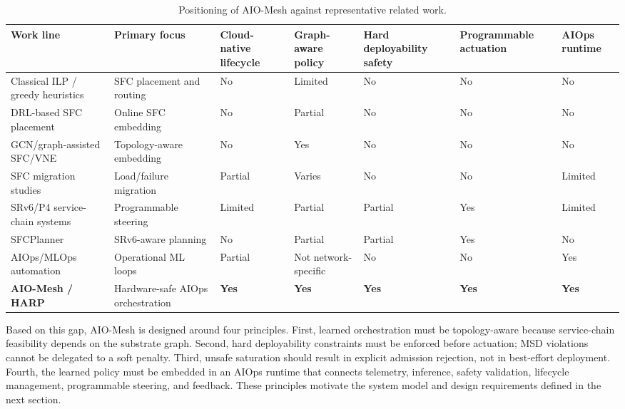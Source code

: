 \documentclass[final,5p]{elsarticle}
\begin{document}
\begin{table}[t]
\centering
\caption{Positioning of AIO-Mesh against representative related work.}
\label{tab:related_comparison}
\renewcommand{\arraystretch}{1.15}
\small
\begin{tabular}{p{4.0cm}p{3.1cm}p{2.0cm}p{2.1cm}p{2.0cm}p{2.0cm}p{1.8cm}}
\toprule
\textbf{Work line} & \textbf{Primary focus} & \textbf{Cloud-native lifecycle} & \textbf{Graph-aware policy} & \textbf{Hard deployability safety} & \textbf{Programmable actuation} & \textbf{AIOps runtime} \\
\midrule
Classical ILP / greedy heuristics & SFC placement and routing & No & Limited & No & No & No \\
DRL-based SFC placement~\cite{wang2021drl,taktak2024drl,li2023qosaware} & Online SFC embedding & No & Partial & No & No & No \\
GCN/graph-assisted SFC/VNE~\cite{xiao2023twostage,pei2025graph,liu2024sfcml} & Topology-aware embedding & No & Yes & No & No & No \\
SFC migration studies~\cite{zhai2023migration,addad2022ai,qin2023sfcmigrationbudget,afrasiabi2024cluster,zhang2025sfcmigration,hu2026rlpmo} & Load/failure migration & Partial & Varies & No & No & Limited \\
SRv6/P4 service-chain systems~\cite{stockmayer2020p4sfc,xiang2019p4sc,yan2024srv6int,li2024stsfc,ma2024sfcache} & Programmable steering & Limited & Partial & Partial & Yes & Limited \\
SFCPlanner~\cite{qiu2024sfcplanner} & SRv6-aware planning & No & Partial & Partial & Yes & No \\
AIOps/MLOps automation~\cite{kreuzberger2023mlops,diazdearcaya2024joint,eken2025mlops,bayram2025trustworthy,zhang2025aiopsllm,eramo2024architecture} & Operational ML loops & Partial & Not network-specific & No & No & Yes \\
\textbf{AIO-Mesh / HARP} & Hardware-safe AIOps orchestration & \textbf{Yes} & \textbf{Yes} & \textbf{Yes} & \textbf{Yes} & \textbf{Yes} \\
\bottomrule
\end{tabular}
\end{table}

Based on this gap, AIO-Mesh is designed around four principles. First, learned orchestration must be topology-aware because service-chain feasibility depends on the substrate graph. Second, hard deployability constraints must be enforced before actuation; MSD violations cannot be delegated to a soft penalty. Third, unsafe saturation should result in explicit admission rejection, not in best-effort deployment. Fourth, the learned policy must be embedded in an AIOps runtime that connects telemetry, inference, safety validation, lifecycle management, programmable steering, and feedback. These principles motivate the system model and design requirements defined in the next section.
\end{document}
